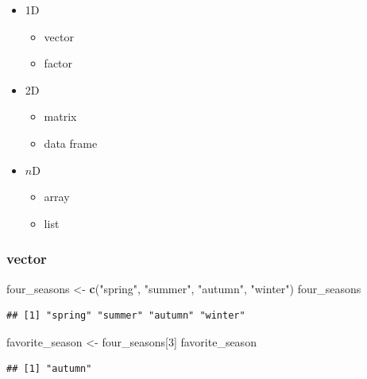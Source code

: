 \documentclass[
]{book}
\newenvironment{Shaded}{\begin{snugshade}}{\end{snugshade}}
\newcommand{\DecValTok}[1]{\textcolor[rgb]{0.00,0.00,0.81}{#1}}
\newcommand{\FunctionTok}[1]{\textcolor[rgb]{0.13,0.29,0.53}{\textbf{#1}}}
\newcommand{\NormalTok}[1]{#1}
\newcommand{\OtherTok}[1]{\textcolor[rgb]{0.56,0.35,0.01}{#1}}
\newcommand{\StringTok}[1]{\textcolor[rgb]{0.31,0.60,0.02}{#1}}
\providecommand{\tightlist}{%
  \setlength{\itemsep}{0pt}\setlength{\parskip}{0pt}}
\theoremstyle{definition}
\theoremstyle{definition}
\theoremstyle{definition}
\theoremstyle{definition}
\theoremstyle{remark}
\begin{document}
\begin{itemize}
\tightlist
\item
  1D

  \begin{itemize}
  \tightlist
  \item
    vector
  \item
    factor
  \end{itemize}
\item
  2D

  \begin{itemize}
  \tightlist
  \item
    matrix
  \item
    data frame
  \end{itemize}
\item
  \(n\)D

  \begin{itemize}
  \tightlist
  \item
    array
  \item
    list
  \end{itemize}
\end{itemize}

\hypertarget{vector}{%
\subsubsection{vector}\label{vector}}

\begin{Shaded}
\begin{Highlighting}[]
\NormalTok{four\_seasons }\OtherTok{\textless{}{-}} \FunctionTok{c}\NormalTok{(}\StringTok{"spring"}\NormalTok{, }\StringTok{"summer"}\NormalTok{, }\StringTok{"autumn"}\NormalTok{, }\StringTok{"winter"}\NormalTok{)}
\NormalTok{four\_seasons}
\end{Highlighting}
\end{Shaded}

\begin{verbatim}
## [1] "spring" "summer" "autumn" "winter"
\end{verbatim}

\begin{Shaded}
\begin{Highlighting}[]
\NormalTok{favorite\_season }\OtherTok{\textless{}{-}}\NormalTok{ four\_seasons[}\DecValTok{3}\NormalTok{]}
\NormalTok{favorite\_season}
\end{Highlighting}
\end{Shaded}

\begin{verbatim}
## [1] "autumn"
\end{verbatim}
\end{document}
